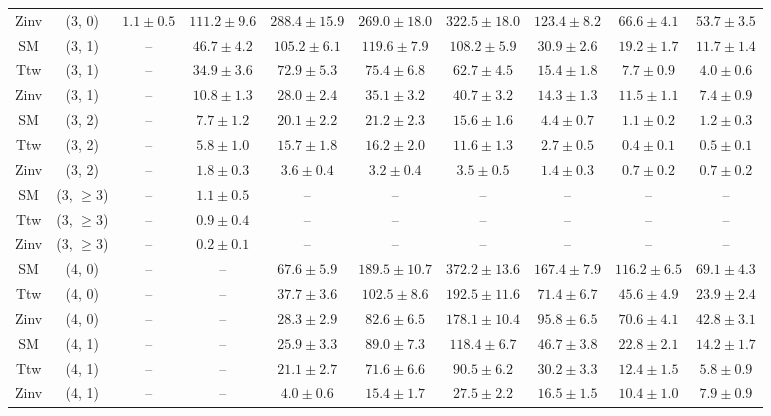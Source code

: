 \begin{table}[h!]
{\begin{tabular}{cccccccccc}
	Zinv & (3, 0) & $1.1\pm 0.5$ & $111.2\pm 9.6$ & $288.4\pm 15.9$ & $269.0\pm 18.0$ & $322.5\pm 18.0$ & $123.4\pm 8.2$ & $66.6\pm 4.1$ & $53.7\pm 3.5$ \\[0.5ex] 
	SM & (3, 1) & -- & $46.7\pm 4.2$ & $105.2\pm 6.1$ & $119.6\pm 7.9$ & $108.2\pm 5.9$ & $30.9\pm 2.6$ & $19.2\pm 1.7$ & $11.7\pm 1.4$ \\[0.5ex] 
	Ttw & (3, 1) & -- & $34.9\pm 3.6$ & $72.9\pm 5.3$ & $75.4\pm 6.8$ & $62.7\pm 4.5$ & $15.4\pm 1.8$ & $7.7\pm 0.9$ & $4.0\pm 0.6$ \\[0.5ex] 
	Zinv & (3, 1) & -- & $10.8\pm 1.3$ & $28.0\pm 2.4$ & $35.1\pm 3.2$ & $40.7\pm 3.2$ & $14.3\pm 1.3$ & $11.5\pm 1.1$ & $7.4\pm 0.9$ \\[0.5ex] 
	SM & (3, 2) & -- & $7.7\pm 1.2$ & $20.1\pm 2.2$ & $21.2\pm 2.3$ & $15.6\pm 1.6$ & $4.4\pm 0.7$ & $1.1\pm 0.2$ & $1.2\pm 0.3$ \\[0.5ex] 
	Ttw & (3, 2) & -- & $5.8\pm 1.0$ & $15.7\pm 1.8$ & $16.2\pm 2.0$ & $11.6\pm 1.3$ & $2.7\pm 0.5$ & $0.4\pm 0.1$ & $0.5\pm 0.1$ \\[0.5ex] 
	Zinv & (3, 2) & -- & $1.8\pm 0.3$ & $3.6\pm 0.4$ & $3.2\pm 0.4$ & $3.5\pm 0.5$ & $1.4\pm 0.3$ & $0.7\pm 0.2$ & $0.7\pm 0.2$ \\[0.5ex] 
	SM & (3, $\ge3$) & -- & $1.1\pm 0.5$ & -- & -- & -- & -- & -- & -- \\[0.5ex] 
	Ttw & (3, $\ge3$) & -- & $0.9\pm 0.4$ & -- & -- & -- & -- & -- & -- \\[0.5ex] 
	Zinv & (3, $\ge3$) & -- & $0.2\pm 0.1$ & -- & -- & -- & -- & -- & -- \\[0.5ex] 
	SM & (4, 0) & -- & -- & $67.6\pm 5.9$ & $189.5\pm 10.7$ & $372.2\pm 13.6$ & $167.4\pm 7.9$ & $116.2\pm 6.5$ & $69.1\pm 4.3$ \\[0.5ex] 
	Ttw & (4, 0) & -- & -- & $37.7\pm 3.6$ & $102.5\pm 8.6$ & $192.5\pm 11.6$ & $71.4\pm 6.7$ & $45.6\pm 4.9$ & $23.9\pm 2.4$ \\[0.5ex] 
	Zinv & (4, 0) & -- & -- & $28.3\pm 2.9$ & $82.6\pm 6.5$ & $178.1\pm 10.4$ & $95.8\pm 6.5$ & $70.6\pm 4.1$ & $42.8\pm 3.1$ \\[0.5ex] 
	SM & (4, 1) & -- & -- & $25.9\pm 3.3$ & $89.0\pm 7.3$ & $118.4\pm 6.7$ & $46.7\pm 3.8$ & $22.8\pm 2.1$ & $14.2\pm 1.7$ \\[0.5ex] 
	Ttw & (4, 1) & -- & -- & $21.1\pm 2.7$ & $71.6\pm 6.6$ & $90.5\pm 6.2$ & $30.2\pm 3.3$ & $12.4\pm 1.5$ & $5.8\pm 0.9$ \\[0.5ex] 
	Zinv & (4, 1) & -- & -- & $4.0\pm 0.6$ & $15.4\pm 1.7$ & $27.5\pm 2.2$ & $16.5\pm 1.5$ & $10.4\pm 1.0$ & $7.9\pm 0.9$ \\[0.5ex] 

\end{tabular}}
\end{table}
